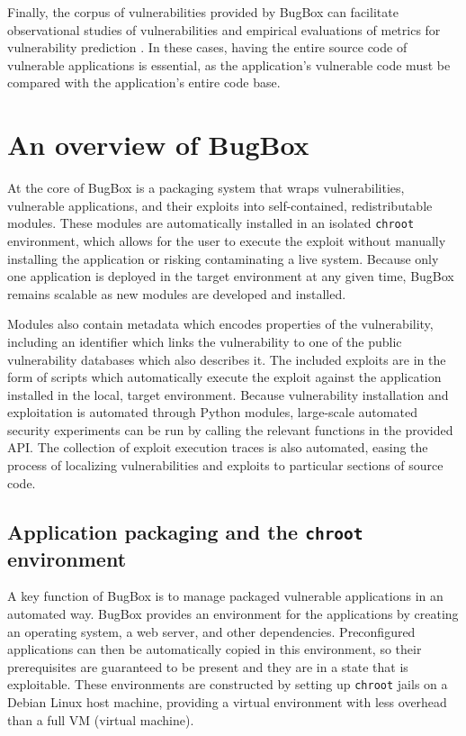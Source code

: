 \documentclass[letterpaper,twocolumn,10pt]{article}
\begin{document}
Finally, the corpus of vulnerabilities provided by BugBox can facilitate observational studies of vulnerabilities \cite{empiricalinvestigation} and empirical evaluations of metrics for vulnerability prediction \cite{evalcomplexityvul,metrisec2012surface}. In these cases, having the entire source code of vulnerable applications is essential, as the application's vulnerable code must be compared with the application's entire code base.

\section{An overview of BugBox}

At the core of BugBox is a packaging system that wraps vulnerabilities, vulnerable applications, and their exploits into self-contained, redistributable modules. These modules are automatically installed in an isolated \texttt{chroot} environment, which allows for the user to execute the exploit without manually installing the application or risking contaminating a live system. Because only one application is deployed in the target environment at any given time, BugBox remains scalable as new modules are developed and installed.

Modules also contain metadata which encodes properties of the vulnerability, including an identifier which links the vulnerability to one of the public vulnerability databases which also describes it. The included exploits are in the form of scripts which automatically execute the exploit against the application installed in the local, target environment. Because vulnerability installation and exploitation is automated through Python modules, large-scale automated security experiments can be run by calling the relevant functions in the provided API. The collection of exploit execution traces is also automated, easing the process of localizing vulnerabilities and exploits to particular sections of source code.

\subsection{Application packaging and the {\tt chroot} environment}

A key function of BugBox is to manage packaged vulnerable applications in an automated way. BugBox provides an environment for the applications by creating an operating system, a web server, and other dependencies. Preconfigured applications can then be automatically copied in this environment, so their prerequisites are guaranteed to be present and they are in a state that is exploitable. These environments are constructed by setting up {\tt chroot} jails on a Debian Linux host machine, providing a virtual environment with less overhead than a full VM (virtual machine).
\end{document}
